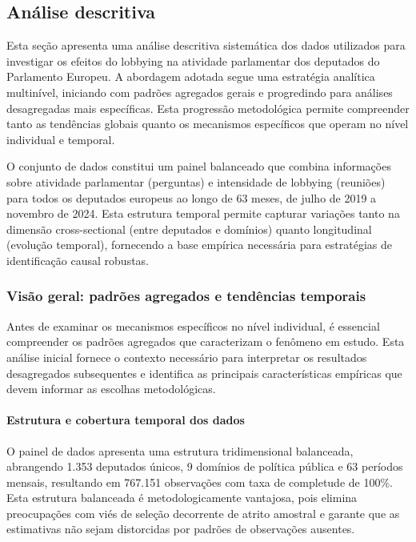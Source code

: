 \subsection{Análise descritiva}
\label{sec:resultados_descritica}

Esta seção apresenta uma análise descritiva sistemática dos dados utilizados para investigar os efeitos do lobbying na atividade parlamentar dos deputados do Parlamento Europeu. A abordagem adotada segue uma estratégia analítica multinível, iniciando com padrões agregados gerais e progredindo para análises desagregadas mais específicas. Esta progressão metodológica permite compreender tanto as tendências globais quanto os mecanismos específicos que operam no nível individual e temporal.

O conjunto de dados constitui um painel balanceado que combina informações sobre atividade parlamentar (perguntas) e intensidade de lobbying (reuniões) para todos os deputados europeus ao longo de 63 meses, de julho de 2019 a novembro de 2024. Esta estrutura temporal permite capturar variações tanto na dimensão cross-sectional (entre deputados e domínios) quanto longitudinal (evolução temporal), fornecendo a base empírica necessária para estratégias de identificação causal robustas.

\subsubsection{Visão geral: padrões agregados e tendências temporais}

Antes de examinar os mecanismos específicos no nível individual, é essencial compreender os padrões agregados que caracterizam o fenômeno em estudo. Esta análise inicial fornece o contexto necessário para interpretar os resultados desagregados subsequentes e identifica as principais características empíricas que devem informar as escolhas metodológicas.

\paragraph{Estrutura e cobertura temporal dos dados}

O painel de dados apresenta uma estrutura tridimensional balanceada, abrangendo 1.353 deputados únicos, 9 domínios de política pública e 63 períodos mensais, resultando em 767.151 observações com taxa de completude de 100\%. Esta estrutura balanceada é metodologicamente vantajosa, pois elimina preocupações com viés de seleção decorrente de atrito amostral e garante que as estimativas não sejam distorcidas por padrões de observações ausentes.

